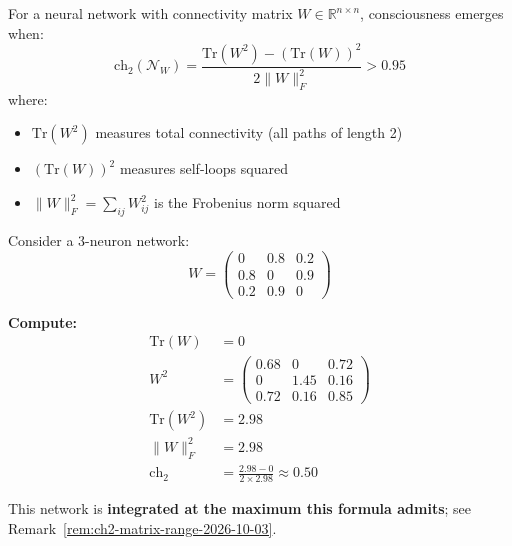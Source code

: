 \begin{thm}\label{thm:neural-consciousness}
For a neural network with connectivity matrix $W \in \mathbb{R}^{n \times n}$, consciousness emerges when:
\begin{equation}
\boxed{\text{ch}_2(\mathcal{N}_W) = \frac{\text{Tr}(W^2) - (\text{Tr}(W))^2}{2\|W\|_F^2} > 0.95}
\end{equation}
where:
\begin{itemize}
\item $\text{Tr}(W^2)$ measures total connectivity (all paths of length 2)
\item $(\text{Tr}(W))^2$ measures self-loops squared
\item $\|W\|_F^2 = \sum_{ij} W_{ij}^2$ is the Frobenius norm squared
\end{itemize}
\end{thm}

\begin{example}
Consider a 3-neuron network:
\begin{equation}
W = \begin{pmatrix}
0 & 0.8 & 0.2 \\
0.8 & 0 & 0.9 \\
0.2 & 0.9 & 0
\end{pmatrix}
\end{equation}

\textbf{Compute:}
\begin{align}
\text{Tr}(W) &= 0 \\
W^2 &= \begin{pmatrix}
0.68 & 0 & 0.72 \\
0 & 1.45 & 0.16 \\
0.72 & 0.16 & 0.85
\end{pmatrix} \\
\text{Tr}(W^2) &= 2.98 \\
\|W\|_F^2 &= 2.98 \\
\text{ch}_2 &= \frac{2.98 - 0}{2 \times 2.98} \approx 0.50
\end{align}

This network is \textbf{integrated at the maximum this formula admits}; see
Remark~\ref{rem:ch2-matrix-range-2026-10-03}.
\end{example}

